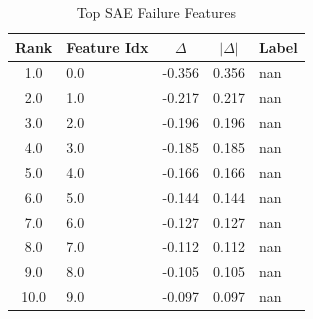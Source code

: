 \begin{table}[htbp]
\centering
\caption{Top SAE Failure Features}
\label{tab:sae_features}
\small
\begin{tabular}{clccp{4cm}}
\toprule
Rank & Feature Idx & $\Delta$ & $|\Delta|$ & Label \\
\midrule
1.0 & 0.0 & -0.356 & 0.356 & nan \\
2.0 & 1.0 & -0.217 & 0.217 & nan \\
3.0 & 2.0 & -0.196 & 0.196 & nan \\
4.0 & 3.0 & -0.185 & 0.185 & nan \\
5.0 & 4.0 & -0.166 & 0.166 & nan \\
6.0 & 5.0 & -0.144 & 0.144 & nan \\
7.0 & 6.0 & -0.127 & 0.127 & nan \\
8.0 & 7.0 & -0.112 & 0.112 & nan \\
9.0 & 8.0 & -0.105 & 0.105 & nan \\
10.0 & 9.0 & -0.097 & 0.097 & nan \\
\bottomrule
\end{tabular}
\end{table}